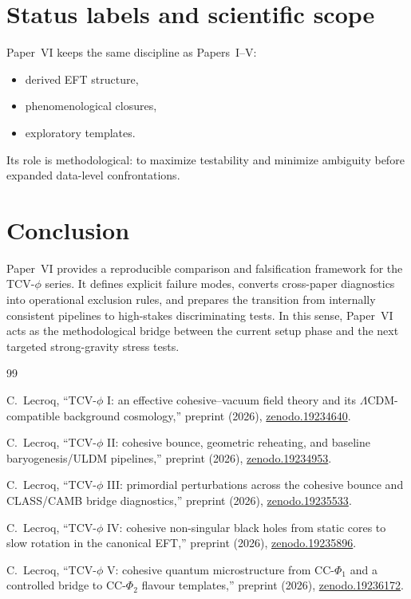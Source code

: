\documentclass[aps,prd,onecolumn,nofootinbib,superscriptaddress]{revtex4-2}
\begin{document}
\section{Status labels and scientific scope}
Paper~VI keeps the same discipline as Papers~I--V:
\begin{itemize}
  \item derived EFT structure,
  \item phenomenological closures,
  \item exploratory templates.
\end{itemize}
Its role is methodological: to maximize testability and minimize ambiguity before expanded data-level confrontations.

\section{Conclusion}
Paper~VI provides a reproducible comparison and falsification framework for the TCV-$\phi$ series.
It defines explicit failure modes, converts cross-paper diagnostics into operational exclusion rules, and prepares the transition from internally consistent pipelines to high-stakes discriminating tests.
In this sense, Paper~VI acts as the methodological bridge between the current setup phase and the next targeted strong-gravity stress tests.

\begin{thebibliography}{99}

C.~Lecroq, ``TCV-$\phi$ I: an effective cohesive--vacuum field theory and its $\Lambda$CDM-compatible background cosmology,'' preprint (2026), \href{https://doi.org/10.5281/zenodo.19234640}{zenodo.19234640}.

C.~Lecroq, ``TCV-$\phi$ II: cohesive bounce, geometric reheating, and baseline baryogenesis/ULDM pipelines,'' preprint (2026), \href{https://doi.org/10.5281/zenodo.19234953}{zenodo.19234953}.

C.~Lecroq, ``TCV-$\phi$ III: primordial perturbations across the cohesive bounce and CLASS/CAMB bridge diagnostics,'' preprint (2026), \href{https://doi.org/10.5281/zenodo.19235533}{zenodo.19235533}.

C.~Lecroq, ``TCV-$\phi$ IV: cohesive non-singular black holes from static cores to slow rotation in the canonical EFT,'' preprint (2026), \href{https://doi.org/10.5281/zenodo.19235896}{zenodo.19235896}.

C.~Lecroq, ``TCV-$\phi$ V: cohesive quantum microstructure from CC-$\Phi_1$ and a controlled bridge to CC-$\Phi_2$ flavour templates,'' preprint (2026), \href{https://doi.org/10.5281/zenodo.19236172}{zenodo.19236172}.

\end{thebibliography}
\end{document}
